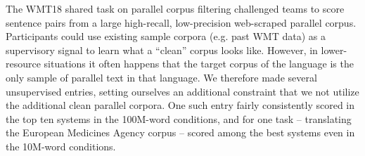 The WMT18 shared task on parallel corpus filtering challenged teams to score sentence pairs from a large high-recall, low-precision web-scraped parallel corpus.  Participants could use existing sample corpora (e.g. past WMT data) as a supervisory signal to learn what a ``clean'' corpus looks like.  However, in lower-resource situations it often happens that the target corpus of the language is the only sample of parallel text in that language. We therefore made several unsupervised entries, setting ourselves an additional constraint that we not utilize the additional clean parallel corpora. One such entry fairly consistently scored in the top ten systems in the 100M-word conditions, and for one task -- translating the European Medicines Agency corpus -- scored among the best systems even in the 10M-word conditions.
